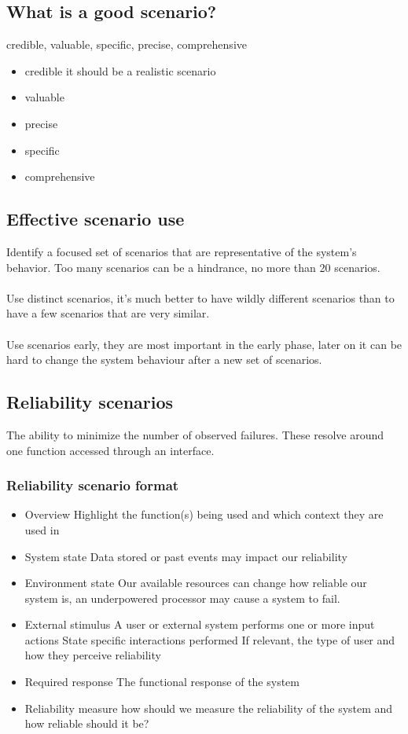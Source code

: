 \subsection{What is a good scenario?}
credible, valuable, specific, precise, comprehensive
\begin{itemize}
	\item credible
	      \subitem it should be a realistic scenario
	\item valuable
	      \subitem
	\item precise
	\item specific
	\item comprehensive
\end{itemize}

\subsection{Effective scenario use}
Identify a focused set of scenarios that are representative of the system's behavior. Too many scenarios can be a hindrance, no more than 20 scenarios.\\
\\
Use distinct scenarios, it's much better to have wildly different scenarios than to have a few scenarios that are very similar.\\
\\
Use scenarios early, they are most important in the early phase, later on it can be hard to change the system behaviour after a new set of scenarios.

\subsection{Reliability scenarios}
The ability to minimize the number of observed failures. These resolve around one function accessed through an interface.
\subsubsection{Reliability scenario format}
\begin{itemize}
	\item Overview
	      \subitem Highlight the function(s) being used and which context they are used in
	\item System state
	      \subitem Data stored or past events may impact our reliability
	\item Environment state
	      \subitem Our available resources can change how reliable our system is, an underpowered processor may cause a system to fail.
	\item External stimulus
	      \subitem A user or external system performs one or more input actions
	      \subitem State specific interactions performed
	      \subitem If relevant, the type of user and how they perceive reliability
	\item Required response
	      \subitem The functional response of the system
	\item Reliability measure
	      \subitem how should we measure the reliability of the system and how reliable should it be?
\end{itemize}
